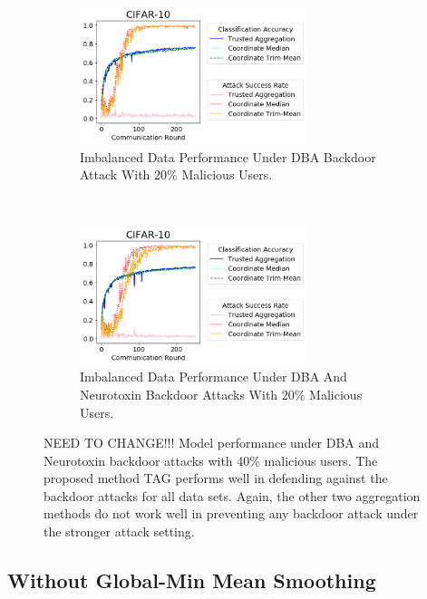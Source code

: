 \documentclass{article} %
\begin{document}
\begin{figure}[htp]
\centering
  \begin{subfigure}{.5\textwidth}
  \centering
    \includegraphics[height=4cm, width=\textwidth]{make_article/make_visuals/visuals/accuracy--cifar_10--n_malicious2--dba1--beta0.2--alpha1.png}
    \caption{\footnotesize Imbalanced Data Performance Under DBA Backdoor Attack With 20\% Malicious Users.}
  \end{subfigure}%
  ~
  \begin{subfigure}{.5\textwidth}
  \centering
    \includegraphics[height=4cm, width=\textwidth]{make_article/make_visuals/visuals/accuracy--cifar_10--n_malicious2--dba1--beta0.2--neuro_p0.1--alpha1.png}
    \caption{\footnotesize Imbalanced Data Performance Under DBA And Neurotoxin Backdoor Attacks With 20\% Malicious Users.}
  \end{subfigure}%
\caption{\footnotesize NEED TO CHANGE!!! Model performance under DBA and Neurotoxin backdoor attacks with 40\% malicious users. The proposed method TAG performs well in defending against the backdoor attacks for all data sets. Again, the other two aggregation methods do not work well in preventing any backdoor attack under the stronger attack setting.}
\label{fig: accuracy--n_malicious4}
\end{figure}


%
\subsection{Without Global-Min Mean Smoothing}

\end{document}
